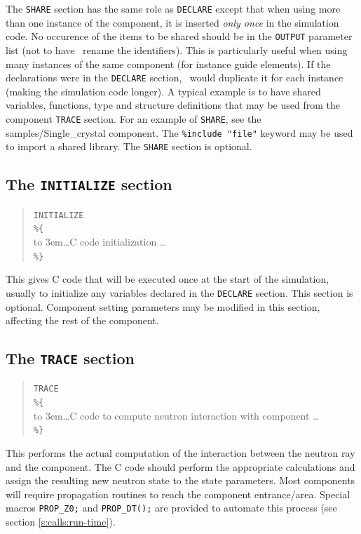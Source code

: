 The \texttt{SHARE} section has the same role as \texttt{DECLARE} except that when using more than one instance of the component, it is inserted \emph{only once} in the simulation code. No occurence of the items to be shared should be in the \texttt{OUTPUT} parameter list (not to have \MCS\ rename the identifiers).
This is particularly useful when using many instances of the same component (for instance guide elements). If the declarations were in the \texttt{DECLARE} section, \MCS\ would duplicate it for each instance (making the simulation code longer).
A typical example is to have shared variables, functions, type and structure definitions that may be used from the component \texttt{TRACE} section. For an
example of \texttt{SHARE}, see the samples/Single\_crystal
component. The \verb+%include "file"+ keyword may be used to import
a shared library. The \texttt{SHARE} section is optional.

\subsection{The \texttt{INITIALIZE} section}
\label{s:comp-initialize}

\begin{quote}
  \texttt{INITIALIZE} \\
  \verb|%{| \\
  \hbox to 3em{}\ldots C code initialization \ldots \\
  \verb|%}|
\end{quote}
This gives C code that will be executed once at the start of the
simulation, usually to initialize any variables declared in the
\texttt{DECLARE} section. This section is optional. Component setting parameters may be modified in this section, affecting the rest of the component.


\subsection{The \texttt{TRACE} section}
\label{s:comp-trace}

\begin{quote}
  \texttt{TRACE} \\
  \verb|%{| \\
  \hbox to 3em{}\ldots C code to compute neutron interaction with
    component \ldots \\
  \verb|%}|
\end{quote}
This performs the actual computation of the interaction between the
neutron ray and the component. The C code should perform the appropriate
calculations and assign the resulting new neutron state to the state
parameters. Most components will require propagation routines to reach the component entrance/area. Special macros \verb+PROP_Z0;+ and \verb+PROP_DT();+ are provided to automate this process (see section \ref{s:calls:run-time}).

